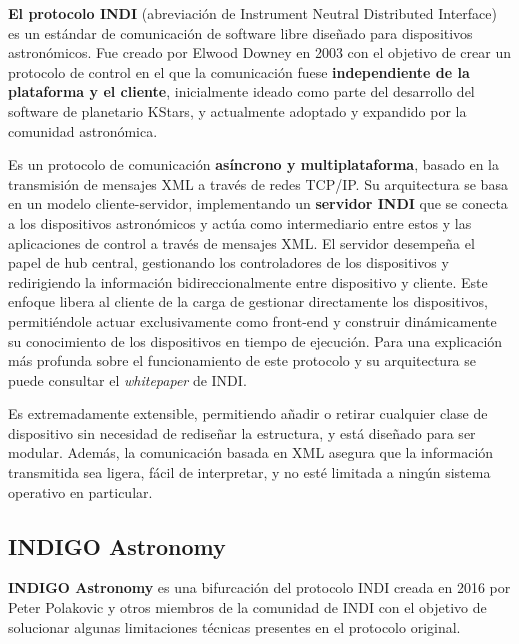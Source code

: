 \textbf{El protocolo INDI}\cite{indi-library} (abreviación de Instrument Neutral Distributed Interface) es un estándar de comunicación de software libre diseñado para dispositivos astronómicos. Fue creado por Elwood Downey en 2003 con el objetivo de crear un protocolo de control en el que la comunicación fuese \textbf{independiente de la plataforma y el cliente}, inicialmente ideado como parte del desarrollo del software de planetario KStars\cite{kstars}, y actualmente adoptado y expandido por la comunidad astronómica.

Es un protocolo de comunicación \textbf{asíncrono y multiplataforma}, basado en la transmisión de mensajes XML a través de redes TCP/IP. Su arquitectura se basa en un modelo cliente-servidor, implementando un \textbf{servidor INDI} que se conecta a los dispositivos astronómicos y actúa como intermediario entre estos y las aplicaciones de control a través de mensajes XML. El servidor desempeña el papel de hub central, gestionando los controladores de los dispositivos y redirigiendo la información bidireccionalmente entre dispositivo y cliente. Este enfoque libera al cliente de la carga de gestionar directamente los dispositivos, permitiéndole actuar exclusivamente como front-end y construir dinámicamente su conocimiento de los dispositivos en tiempo de ejecución. Para una explicación más profunda sobre el funcionamiento de este protocolo y su arquitectura se puede consultar el \textit{whitepaper} de INDI\cite{indi-whitepaper}.

Es extremadamente extensible, permitiendo añadir o retirar cualquier clase de dispositivo sin necesidad de rediseñar la estructura, y está diseñado para ser modular. Además, la comunicación basada en XML asegura que la información transmitida sea ligera, fácil de interpretar, y no esté limitada a ningún sistema operativo en particular.


\newpage

\subsection{INDIGO Astronomy}

\textbf{INDIGO Astronomy}\cite{indigo} es una bifurcación del protocolo INDI creada en 2016 por Peter Polakovic y otros miembros de la comunidad de INDI con el objetivo de solucionar algunas limitaciones técnicas presentes en el protocolo original. 

